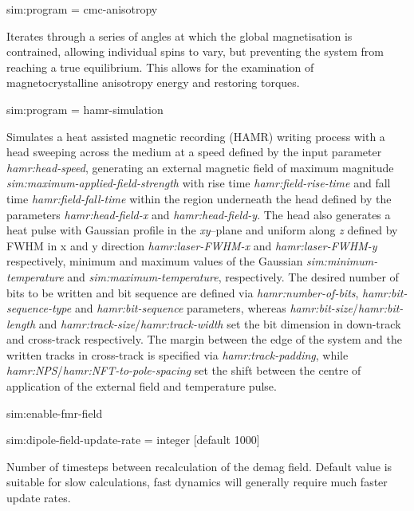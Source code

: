 {\zicf sim:program = cmc-anisotropy} Iterates through a series of angles at which the global magnetisation is contrained, allowing individual spins to vary, but preventing the system from reaching a true equilibrium. This allows for the examination of magnetocrystalline anisotropy energy and restoring torques.

{\zicf sim:program = hamr-simulation}
Simulates a heat assisted magnetic recording (HAMR) writing process with a head sweeping across the medium at a speed
defined by the input parameter \textit{hamr:head-speed}, generating an external magnetic field of maximum magnitude
\textit{sim:maximum-applied-field-strength} with rise time \textit{hamr:field-rise-time} and fall time \textit{hamr:field-fall-time}
within the region underneath the head defined by the parameters \textit{hamr:head-field-x} and \textit{hamr:head-field-y}.
The head also generates a heat pulse with Gaussian profile in the \textit{xy}--plane and uniform along \textit{z}
defined by FWHM in x and y direction \textit{hamr:laser-FWHM-x} and \textit{hamr:laser-FWHM-y} respectively,
minimum and maximum values of the Gaussian \textit{sim:minimum-temperature} and \textit{sim:maximum-temperature}, respectively.
The desired number of bits to be written and bit sequence are defined via
\textit{hamr:number-of-bits}, \textit{hamr:bit-sequence-type} and \textit{hamr:bit-sequence} parameters, whereas
\textit{hamr:bit-size}/\textit{hamr:bit-length} and \textit{hamr:track-size}/\textit{hamr:track-width} set the bit
dimension in down-track and cross-track respectively.
The margin between the edge of the system and the written tracks in cross-track is specified via
\textit{hamr:track-padding}, while \textit{hamr:NPS}/\textit{hamr:NFT-to-pole-spacing}
set the shift between the centre of application of the external field and temperature pulse.

{\zicf sim:enable-fmr-field}

{\zicf sim:dipole-field-update-rate = integer [default 1000]}
Number of timesteps between recalculation of the demag field. Default value is suitable for slow calculations, fast dynamics will generally require much faster update rates.

